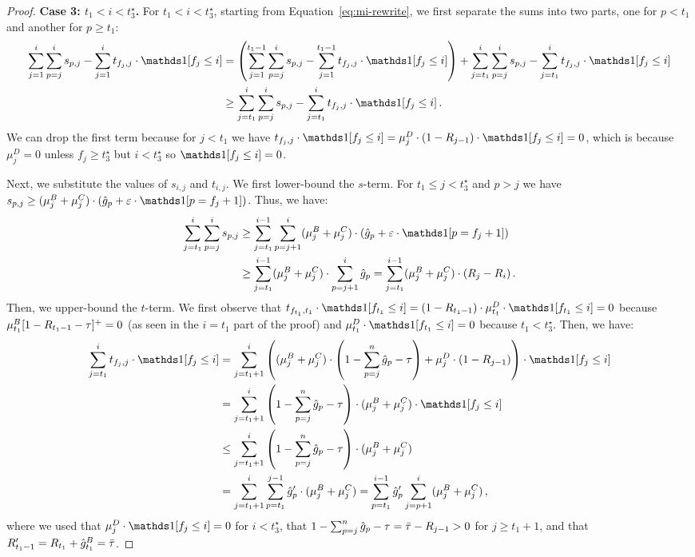 \begin{proof}
    \smallskip
    \noindent\textbf{Case 3: $t_1<i<t_3^\star$.} For $t_1 < i < t_3^\star$, starting from Equation~\ref{eq:mi-rewrite}, we first separate the sums into two parts, one for $p < t_1$ and another for $p \geq t_1$:
    \begin{align*}
        \sum_{j=1}^i \sum_{p=j}^i s_{p,j} - \sum_{j=1}^i t_{f_j, j} \cdot \ind [f_j \leq i] 
        &= \left(\sum_{j=1}^{t_1 - 1} \sum_{p=j}^i s_{p,j} - \sum_{j=1}^{t_1 - 1} t_{f_j, j} \cdot \ind [f_j \leq i]\right) + \sum_{j=t_1}^i \sum_{p=j}^i s_{p,j} - \sum_{j=t_1}^i t_{f_j, j} \cdot \ind [f_j \leq i] \\
        &\geq\sum_{j=t_1}^i \sum_{p=j}^i s_{p,j} - \sum_{j=t_1}^i t_{f_j, j} \cdot \ind [f_j \leq i]\,.
    \end{align*}
    We can drop the first term because for $j < t_1$ we have $t_{f_j, j} \cdot \ind[f_j \leq i] = \mu_j^D \cdot (1 - R_{j - 1}) \cdot \ind[f_j \leq i] = 0$, which is because $\mu_j^D = 0$ unless $f_j \geq t_3^\star$ but $i < t_3^\star$ so $\ind[f_j \leq i] = 0$.
    
    Next, we substitute the values of $s_{i,j}$ and $t_{i,j}$. We first lower-bound the $s$-term. For $t_1\leq j<t_3^\star$ and $p>j$ we have $s_{p,j} \geq (\mu_j^B + \mu_j^C) \cdot (\hg_p + \Mcoeffmone\cdot \ind[p=f_j+1])$. Thus, we have:
    \begin{align*}
        \sum_{j=t_1}^i \sum_{p=j}^i s_{p,j} 
        &\geq \sum_{j=t_1}^{i-1} \sum_{p=j+1}^{i} (\mu_j^B + \mu_j^C) \cdot \left(\hg_{p} + \Mcoeffmone\cdot \ind[p=f_j+1]\right)  \\
        &\geq \sum_{j=t_1}^{i-1} (\mu_j^B + \mu_j^C) \cdot \sum_{p=j+1}^{i} \hg_{p}
        = \sum_{j=t_1}^{i-1} (\mu_j^B + \mu_j^C) \cdot (R_j-R_i)\,.
    \end{align*}
    Then, we upper-bound the $t$-term. We first observe that $t_{f_{t_1}, t_1} \cdot \ind[f_{t_1} \leq i] = (1-R_{t_1-1}) \cdot \mu_{t_1}^D \cdot \ind[f_{t_1} \leq i] = 0$ because $\mu_{t_1}^B [1-R_{t_1-1}-\tau]^+ =0$ (as seen in the $i=t_1$ part of the proof) and $\mu_{t_1}^D \cdot \ind[f_{t_1} \leq i]=0$ because $t_1<t_3^\star$. Then, we have:
    \begin{align*}
        \sum_{j=t_1}^i t_{f_j, j} \cdot \ind [f_j \leq i]
        &= \sum_{j=t_1+1}^i \left((\mu_j^B+\mu_j^C)\cdot \left(1-\sum_{p=j}^{n} \hg_{p}-\Mtone\right) + \mu_j^D \cdot (1-R_{j-1})\right) \cdot \ind [f_j \leq i] \\
        &= \sum_{j=t_1+1}^i \left(1- \sum_{p=j}^{n} \hg_{p}-\Mtone \right)\cdot(\mu_j^B+\mu_j^C)\cdot \ind [f_j \leq i]\\
        &\leq \sum_{j=t_1+1}^i \left(1- \sum_{p=j}^{n} \hg_{p}-\Mtone \right)\cdot(\mu_j^B+\mu_j^C) \\
        &= \sum_{j=t_1+1}^i \sum_{p=t_1}^{j-1} \hg'_p \cdot(\mu_j^B+\mu_j^C)
        = \sum_{p=t_1}^{i-1} \hg'_p \sum_{j=p+1}^{i} (\mu_j^B+\mu_j^C)\,,
    \end{align*}
    where we used that $\mu_j^D\cdot \ind[f_j \leq i]=0$ for $i<t_3^\star$, that $1- \sum_{p=j}^{n} \hat{g}_{p}-\tau = \bar\tau - R_{j-1} > 0$ for $j \geq t_1 + 1$, and that $R'_{t_1 - 1} = R_{t_1} + \hat{g}_{t_1}^B = \bar\tau$.


\end{proof}
